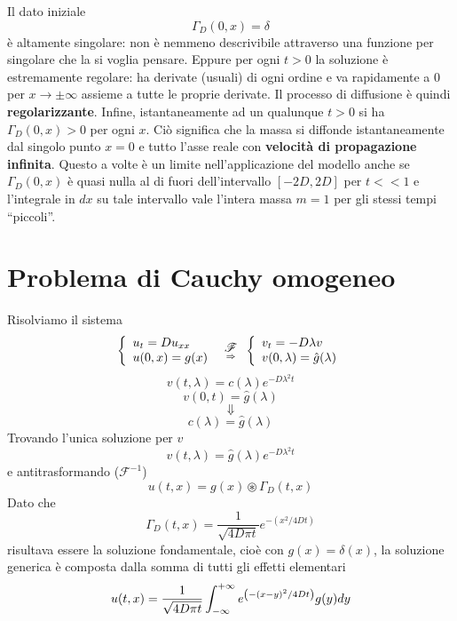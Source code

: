 Il dato iniziale
\[
	\Gamma_D(0,x)= \delta
\]
\`e altamente singolare: non \`e nemmeno descrivibile attraverso una funzione
per singolare che la si voglia pensare.
Eppure per ogni $t>0$ la soluzione \`e estremamente regolare: ha derivate
(usuali)
di ogni ordine e va rapidamente a $0$ per $x \to \pm \infty$ assieme a tutte
le proprie derivate.
Il processo di diffusione \`e quindi {\bf regolarizzante}.
Infine, istantaneamente ad un qualunque $t>0$ si ha $\Gamma_D(0,x)>0$ per ogni
$x$. Ci\`o significa che la massa si diffonde istantaneamente dal singolo punto
$x=0$ e tutto l'asse reale con {\bf velocit\`a di propagazione infinita}.
Questo a volte \`e un limite nell'applicazione del modello anche se
$\Gamma_D(0,x)$
\`e quasi nulla al di fuori dell'intervallo $[-2D, 2D]$ per $t<<1$ e
l'integrale in $dx$ su tale intervallo vale l'intera massa $m=1$ per gli
stessi tempi ``piccoli''.
\section{Problema di Cauchy omogeneo}
Risolviamo il sistema
\[
	\left\{
	\begin{array}{l}
		u_t= Du_{xx}\\
		u(0,x)= g(x)
	\end{array}
	\right.
	\substack{\displaystyle{\mathscr{F}} \\ \;\;\; \Rightarrow \;\;\;}
	\left\{
	\begin{array}{l}
		v_t= -D\lambda v\\
		v(0,\lambda)= \hat{g}(\lambda)
	\end{array}
	\right.
\]
\[
	v(t, \lambda)= c(\lambda)e^{-D\lambda^2t}
\]
\[
	v(0,t)= \hat{g}(\lambda)
\]
\[
	\Downarrow
\]
\[
	c(\lambda)= \hat{g}(\lambda)
\]
Trovando l'unica soluzione per $v$
\[
	v(t,\lambda)= \hat{g}(\lambda)e^{-D\lambda^2t}
\]
e antitrasformando ($\mathscr{F}^{-1}$)
\[
	u(t,x)= g(x) \circledast \Gamma_D(t,x)
\]
Dato che
\[
	\Gamma_D(t,x)=
	\frac{1}{\sqrt{4D\pi t}}
	e^{-\left( x^2/4Dt \right)}
\]
risultava essere la soluzione fondamentale, cio\`e con $g(x)=\delta(x)$,
la soluzione generica \`e composta dalla somma di tutti gli effetti elementari
\[
	u(t,x)= \frac{1}{\sqrt{4D\pi t}} \int_{- \infty}^{+ \infty}
	e^{\left( -(x-y)^2 / 4Dt \right)}
	g(y) dy
\]
